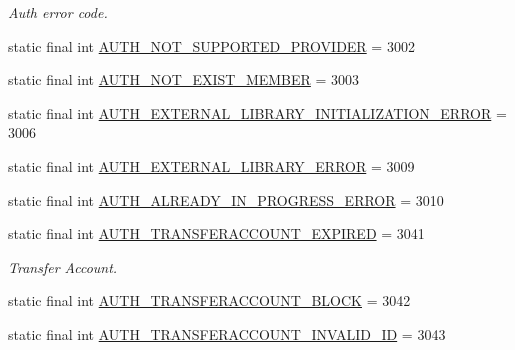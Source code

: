 \begin{DoxyCompactItemize}
\begin{DoxyCompactList}\small\item\em Auth error code. \end{DoxyCompactList}\item 
static final int \hyperlink{classcom_1_1toast_1_1android_1_1gamebase_1_1base_1_1_gamebase_error_af7ba4284e36585835a9b8dec2298b3b8}{A\+U\+T\+H\+\_\+\+N\+O\+T\+\_\+\+S\+U\+P\+P\+O\+R\+T\+E\+D\+\_\+\+P\+R\+O\+V\+I\+D\+ER} = 3002
\item 
static final int \hyperlink{classcom_1_1toast_1_1android_1_1gamebase_1_1base_1_1_gamebase_error_a29b702ab8a898ddbdc0267bf0cad142e}{A\+U\+T\+H\+\_\+\+N\+O\+T\+\_\+\+E\+X\+I\+S\+T\+\_\+\+M\+E\+M\+B\+ER} = 3003
\item 
static final int \hyperlink{classcom_1_1toast_1_1android_1_1gamebase_1_1base_1_1_gamebase_error_ac6eccd46dfa3c4974f1769d10e11335f}{A\+U\+T\+H\+\_\+\+E\+X\+T\+E\+R\+N\+A\+L\+\_\+\+L\+I\+B\+R\+A\+R\+Y\+\_\+\+I\+N\+I\+T\+I\+A\+L\+I\+Z\+A\+T\+I\+O\+N\+\_\+\+E\+R\+R\+OR} = 3006
\item 
static final int \hyperlink{classcom_1_1toast_1_1android_1_1gamebase_1_1base_1_1_gamebase_error_a47a8fc5c51b5a41ec4863fc65d821e91}{A\+U\+T\+H\+\_\+\+E\+X\+T\+E\+R\+N\+A\+L\+\_\+\+L\+I\+B\+R\+A\+R\+Y\+\_\+\+E\+R\+R\+OR} = 3009
\item 
static final int \hyperlink{classcom_1_1toast_1_1android_1_1gamebase_1_1base_1_1_gamebase_error_acc991240d46353185b547cf92e599cd7}{A\+U\+T\+H\+\_\+\+A\+L\+R\+E\+A\+D\+Y\+\_\+\+I\+N\+\_\+\+P\+R\+O\+G\+R\+E\+S\+S\+\_\+\+E\+R\+R\+OR} = 3010
\item 
static final int \hyperlink{classcom_1_1toast_1_1android_1_1gamebase_1_1base_1_1_gamebase_error_acb0b54e38030fdb916fd9fa50f5ce4fa}{A\+U\+T\+H\+\_\+\+T\+R\+A\+N\+S\+F\+E\+R\+A\+C\+C\+O\+U\+N\+T\+\_\+\+E\+X\+P\+I\+R\+ED} = 3041
\begin{DoxyCompactList}\small\item\em Transfer Account. \end{DoxyCompactList}\item 
static final int \hyperlink{classcom_1_1toast_1_1android_1_1gamebase_1_1base_1_1_gamebase_error_a6f3883ade933e5828b220863aac82270}{A\+U\+T\+H\+\_\+\+T\+R\+A\+N\+S\+F\+E\+R\+A\+C\+C\+O\+U\+N\+T\+\_\+\+B\+L\+O\+CK} = 3042
\item 
static final int \hyperlink{classcom_1_1toast_1_1android_1_1gamebase_1_1base_1_1_gamebase_error_ae12065db8f976d55b846e6ab362a976c}{A\+U\+T\+H\+\_\+\+T\+R\+A\+N\+S\+F\+E\+R\+A\+C\+C\+O\+U\+N\+T\+\_\+\+I\+N\+V\+A\+L\+I\+D\+\_\+\+ID} = 3043

\end{DoxyCompactItemize}
